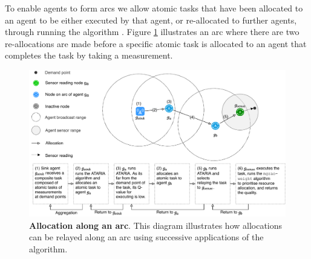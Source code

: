 To enable agents to form arcs we allow atomic tasks that have been allocated to an agent to be either executed by that agent, or re-allocated to further agents, through running the \acronymATARIA{}{} algorithm . Figure \ref{fig:arc-flow} illustrates an arc where there are two re-allocations are made before a specific atomic task is allocated to an agent that completes the task by taking a measurement.
\begin{figure}[ht]
	\centering
	\includegraphics[width=0.8\linewidth, trim={25pt 0pt 25pt 0pt, clip}]{arc-flow}
	\caption{\textbf{Allocation along an arc}. This diagram illustrates how allocations can be relayed along an arc using successive applications of the \acronymATARIA{}{} algorithm.}
	\label{fig:arc-flow}
\end{figure}
